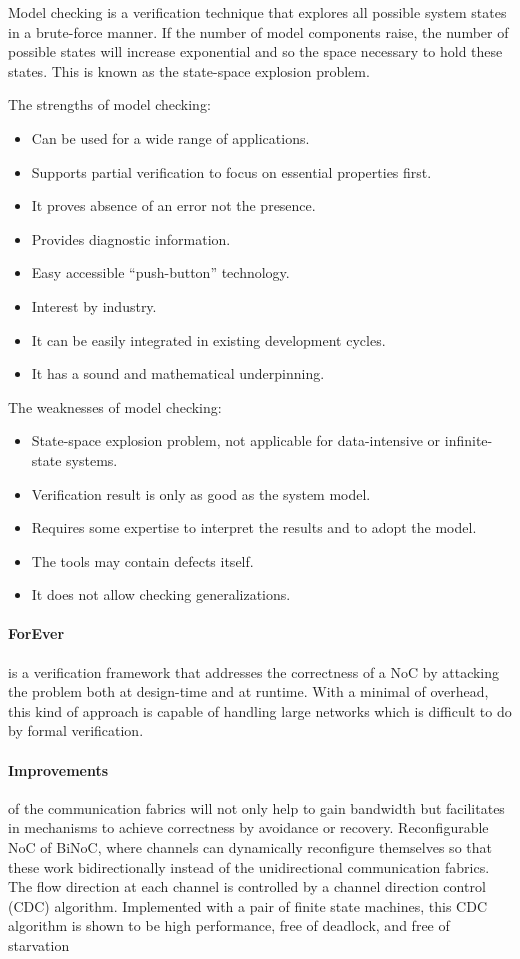 Model checking is a verification technique that explores all possible system
states in a brute-force manner. If the number of model components raise, the
number of possible states will increase exponential and so the space necessary
to hold these states. This is known as the state-space explosion problem.

The strengths of model checking:
\begin{itemize}
\item Can be used for a wide range of applications.
\item Supports partial verification to focus on essential properties first.
\item It proves absence of an error not the presence.
\item Provides diagnostic information.
\item Easy accessible ``push-button'' technology.
\item Interest by industry.
\item It can be easily integrated in existing development cycles.
\item It has a sound and mathematical underpinning.
\end{itemize} 

The weaknesses of model checking:
\begin{itemize}
\item State-space explosion problem, not applicable for data-intensive or
infinite-state systems.
\item Verification result is only as good as the system model.
\item Requires some expertise to interpret the results and to adopt the model.
\item The tools may contain defects itself.
\item It does not allow checking generalizations.
\end{itemize} 


\paragraph{ForEver}is a verification framework that addresses the correctness
of a NoC by attacking the problem both at design-time and at runtime. With a
minimal of overhead, this kind of approach is capable of handling large networks
which is difficult to do by formal verification.
\cite{Parikh:2014:FCF:2597868.2514871}

\paragraph{Improvements}of the communication fabrics will not only help to
gain bandwidth but facilitates in mechanisms to achieve correctness by avoidance
or recovery. Reconfigurable NoC of BiNoC, where channels can dynamically
reconfigure themselves so that these work bidirectionally instead of the
unidirectional communication fabrics. The flow direction at each channel is
controlled by a channel direction control (CDC) algorithm. Implemented with a
pair of finite state machines, this CDC algorithm is shown to be high
performance, free of deadlock, and free of starvation \cite{5715603}

